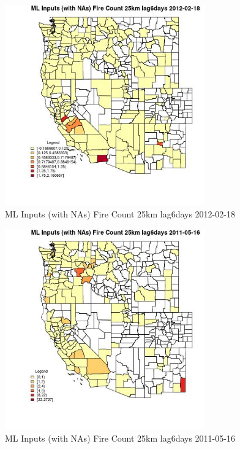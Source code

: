 \begin{figure} 
\centering  
\includegraphics[width=0.77\textwidth]{Code_Outputs/Report_ML_input_PM25_Step4_part_f_de_duplicated_aves_prioritize_24hr_obswNAs_CountyFire_Count_25km_lag6daysMean2012-02-18.jpg} 
\caption{\label{fig:Report_ML_input_PM25_Step4_part_f_de_duplicated_aves_prioritize_24hr_obswNAsCountyFire_Count_25km_lag6daysMean2012-02-18}ML Inputs (with NAs) Fire Count 25km lag6days 2012-02-18} 
\end{figure} 
 

\begin{figure} 
\centering  
\includegraphics[width=0.77\textwidth]{Code_Outputs/Report_ML_input_PM25_Step4_part_f_de_duplicated_aves_prioritize_24hr_obswNAs_CountyFire_Count_25km_lag6daysMean2011-05-16.jpg} 
\caption{\label{fig:Report_ML_input_PM25_Step4_part_f_de_duplicated_aves_prioritize_24hr_obswNAsCountyFire_Count_25km_lag6daysMean2011-05-16}ML Inputs (with NAs) Fire Count 25km lag6days 2011-05-16} 
\end{figure} 
 

